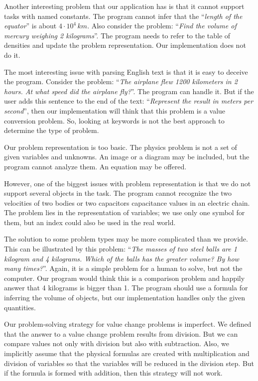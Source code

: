 \documentclass[a4paper, 12pt]{article}
\newcommand{\etext}[1]{\enquote{\textit{#1}}}
\begin{document}
	Another interesting problem that our application has is that it cannot
	support tasks with named constants. The program cannot infer that the
	\etext{length of the equator} is about \(4 \cdot 10^{4}\, km\). Also
	consider the problem: \etext{Find the volume of mercury weighing 2
	kilograms}. The program needs to refer to the table of densities and
	update the problem representation. Our implementation does not do it.
	
	The most interesting issue with parsing English text is that it is easy
	to deceive the program. Consider the problem: \etext{The airplane flew
	1200 kilometers in 2 hours. At what speed did the airplane fly?}. The
	program can handle it. But if the user adds this sentence to the end of
	the text: \etext{Represent the result in meters per second}, then our
	implementation will think that this problem is a value conversion
	problem. So, looking at keywords is not the best approach to determine
	the type of problem.
	
	Our problem representation is too basic. The physics problem is not a
	set of given variables and unknowns. An image or a diagram may be
	included, but the program cannot analyze them. An equation may be
	offered.
	
	However, one of the biggest issues with problem representation is that
	we do not support several objects in the task. The program cannot
	recognize the two velocities of two bodies or two
	capacitors\textquotesingle{} capacitance values in an electric chain.
	The problem lies in the representation of variables; we use only one
	symbol for them, but an index could also be used in the real world.
	
	The solution to some problem types may be more complicated than we
	provide. This can be illustrated by this problem: \etext{The masses of
	two steel balls are 1 kilogram and 4 kilograms. Which of the balls has
	the greater volume? By how many times?}. Again, it is a simple problem
	for a human to solve, but not the computer. Our program would think this
	is a comparison problem and happily answer that 4 kilograms is bigger
	than 1. The program should use a formula for inferring the volume of
	objects, but our implementation handles only the given quantities.
	
	Our problem-solving strategy for value change problems is imperfect. We
	defined that the answer to a value change problem results from division.
	But we can compare values not only with division but also with
	subtraction. Also, we implicitly assume that the physical formulas are
	created with multiplication and division of variables so that the
	variables will be reduced in the division step. But if the formula is
	formed with addition, then this strategy will not work.
	
\end{document}
